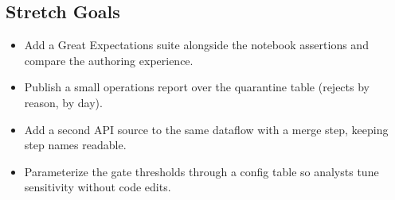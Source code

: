 \subsection*{Stretch Goals}
\begin{itemize}
    \item Add a Great Expectations suite alongside the notebook assertions and compare the authoring experience.
    \item Publish a small operations report over the quarantine table (rejects by reason, by day).
    \item Add a second API source to the same dataflow with a merge step, keeping step names readable.
    \item Parameterize the gate thresholds through a config table so analysts tune sensitivity without code edits.
\end{itemize}
